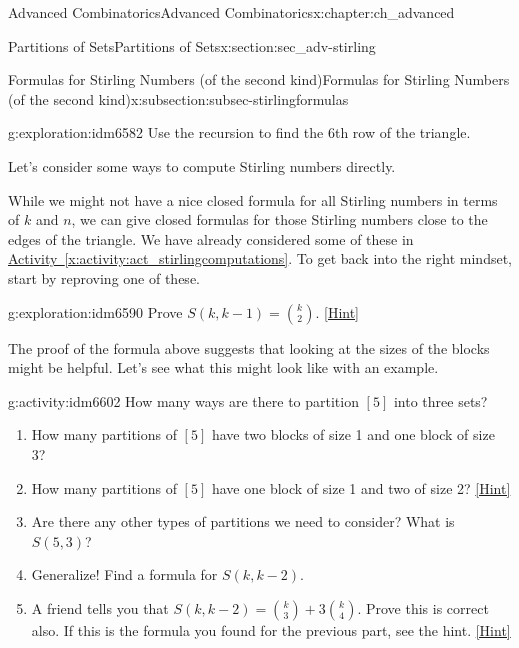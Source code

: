 \documentclass[oneside,10pt,]{book}
\numberwithin{equation}{chapter}
\begin{document}
\begin{chapterptx}{Advanced Combinatorics}{}{Advanced Combinatorics}{}{}{x:chapter:ch_advanced}
\begin{sectionptx}{Partitions of Sets}{}{Partitions of Sets}{}{}{x:section:sec_adv-stirling}
\begin{subsectionptx}{Formulas for Stirling Numbers (of the second kind)}{}{Formulas for Stirling Numbers (of the second kind)}{}{}{x:subsection:subsec-stirlingformulas}
\begin{sidebyside}{1}{0.25}{0.25}{0}
\begin{sbspanel}{0.5}
{\par}
\end{sbspanel}%
\end{sidebyside}%
\begin{exploration}{}{g:exploration:idm6582}%
Use the recursion to find the 6th row of the triangle.%
\end{exploration}
Let's consider some ways to compute Stirling numbers directly.%
\par
While we might not have a nice closed formula for all Stirling numbers in terms of \(k\) and \(n\), we can give closed formulas for those Stirling numbers close to the edges of the triangle.  We have already considered some of these in \hyperref[x:activity:act_stirlingcomputations]{Activity~\ref{x:activity:act_stirlingcomputations}}.  To get back into the right mindset, start by reproving one of these.%
\begin{exploration}{}{g:exploration:idm6590}%
Prove \(S(k, k-1) = \binom{k}{2}\).%
\space\hspace*{0pt}\hfill{\tiny\hyperlink{g:hint:idm6594-back}{[Hint]}}\end{exploration}
The proof of the formula above suggests that looking at the sizes of the blocks might be helpful.  Let's see what this might look like with an example.%
\begin{activity}{}{g:activity:idm6602}%
How many ways are there to partition \([5]\) into three sets?%
\begin{enumerate}[font=\bfseries,label=(\alph*),ref=\alph*]
\item{}How many partitions of \([5]\) have two blocks of size 1 and one block of size 3?%
\item{}How many partitions of \([5]\) have one block of size 1 and two of size 2?%
\space\hspace*{0pt}\hfill{\tiny\hyperlink{g:hint:idm6617-back}{[Hint]}}\item{}Are there any other types of partitions we need to consider?  What is \(S(5,3)\)?%
\item{}Generalize! Find a formula for \(S(k, k-2)\).%
\item{}A friend tells you that \(S(k,k-2) = \binom{k}{3} + 3 \binom{k}{4}\).  Prove this is correct also.  If this is the formula you found for the previous part, see the hint.%
\space\hspace*{0pt}\hfill{\tiny\hyperlink{g:hint:idm6648-back}{[Hint]}}\end{enumerate}
\end{activity}

\end{subsectionptx}
\end{sectionptx}
\end{chapterptx}
\end{document}
